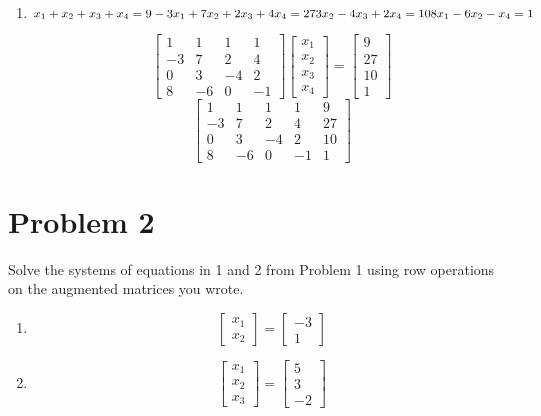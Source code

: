 \documentclass[11pt]{article}
\theoremstyle{definition}
\theoremstyle{remark}
\begin{document}
\begin{enumerate}
\item
$
x_1 + x_2 + x_3 + x_4 = 9 \\
-3x_1 + 7x_2 + 2x_3 + 4x_4 = 27 \\
3x_2 - 4x_3 + 2x_4 = 10 \\
8x_1 - 6x_2 - x_4 = 1 \\
$

{\color{red}
$$ \begin{bmatrix} 
      1 & 1 &  1 & 1 \\ 
     -3 & 7 &  2 & 4 \\
      0 & 3 & -4 & 2 \\
      8 & -6 & 0 & -1
    \end{bmatrix}
    \begin{bmatrix} x_1 \\ x_2 \\ x_3 \\ x_4 \end{bmatrix} =
    \begin{bmatrix} 9 \\ 27 \\ 10 \\ 1 \end{bmatrix}$$
$$ \begin{bmatrix} 
      1 & 1 &  1 & 1 &  9 \\ 
     -3 & 7 &  2 & 4 & 27 \\
      0 & 3 & -4 & 2 & 10 \\
      8 & -6 & 0 & -1 & 1
    \end{bmatrix} $$
}

\end{enumerate}

\section*{Problem 2}
Solve the systems of equations in 1 and 2 from Problem 1 using row operations on the augmented matrices you wrote.

{\color{red}
\begin{enumerate}
\item
$$ \begin{bmatrix} x_1 \\ x_2 \end{bmatrix} = \begin{bmatrix} -3 \\ 1 \end{bmatrix} $$
\item
$$ \begin{bmatrix} x_1 \\ x_2 \\ x_3 \end{bmatrix} = \begin{bmatrix} 5 \\ 3 \\ -2 \end{bmatrix} $$
\end{enumerate}
}
\end{document}
